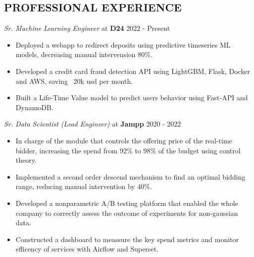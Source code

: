 \documentclass[margin]{res}
\begin{document}
\begin{resume}
    \section{PROFESSIONAL EXPERIENCE} 
    {\sl Sr. Machine Learning Engineer} at {\bf D24} \hfill 2022 - Present
    \begin{itemize}  \itemsep -2pt %
        \item Deployed a webapp to redirect deposits using predictive timeseries ML models, decreasing
            manual intervension 80\%.
        \item Developed a credit card fraud detection API using LightGBM, Flask, Docker and AWS, 
            saving ~20k usd per month.
        \item Built a Life-Time Value model to predict users behavior using Fast-API and DynamoDB.
    \end{itemize}
    {\sl Sr. Data Scientist (Lead Engineer)} at {\bf Jampp} \hfill 2020 - 2022
    \begin{itemize}  \itemsep -2pt %
        \item In charge of the module that controls the offering price of the
            real-time bidder, increasing the spend from 92\% to 98\%
            of the budget using control theory.
        \item Implemented a second order descend mechanism to find an optimal bidding range,
            reducing manual intervention by 40\%.
        \item Developed a nonparametric A/B testing platform that enabled the whole company to 
            correctly assess the outcome of experiments for non-gaussian data. 
        \item Constructed a dashboard to meassure the key spend metrics and monitor
            efficency of services with Airflow and Superset.

\end{itemize}
\end{resume}
\end{document}

